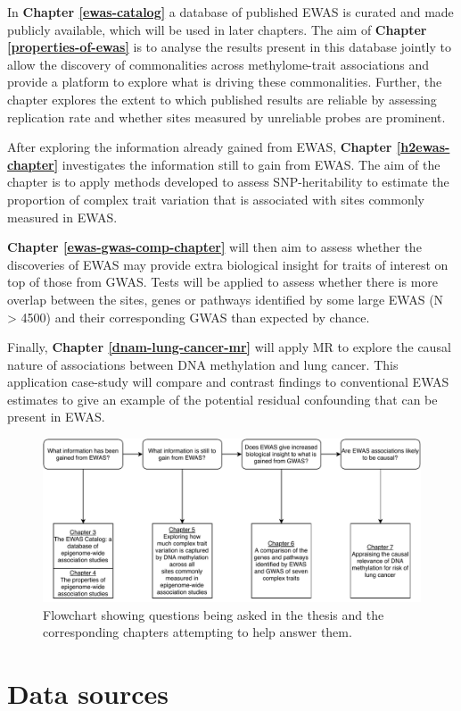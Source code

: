 \documentclass[11pt,oneside]{bristolthesis}
\begin{document}
In \textbf{Chapter \ref{ewas-catalog}} a database of published EWAS is curated and made publicly available, which will be used in later chapters. The aim of \textbf{Chapter \ref{properties-of-ewas}} is to analyse the results present in this database jointly to allow the discovery of commonalities across methylome-trait associations and provide a platform to explore what is driving these commonalities. Further, the chapter explores the extent to which published results are reliable by assessing replication rate and whether sites measured by unreliable probes are prominent.

After exploring the information already gained from EWAS, \textbf{Chapter \ref{h2ewas-chapter}} investigates the information still to gain from EWAS. The aim of the chapter is to apply methods developed to assess SNP-heritability to estimate the proportion of complex trait variation that is associated with sites commonly measured in EWAS.

\textbf{Chapter \ref{ewas-gwas-comp-chapter}} will then aim to assess whether the discoveries of EWAS may provide extra biological insight for traits of interest on top of those from GWAS. Tests will be applied to assess whether there is more overlap between the sites, genes or pathways identified by some large EWAS (N \textgreater{} 4500) and their corresponding GWAS than expected by chance.

Finally, \textbf{Chapter \ref{dnam-lung-cancer-mr}} will apply MR to explore the causal nature of associations between DNA methylation and lung cancer. This application case-study will compare and contrast findings to conventional EWAS estimates to give an example of the potential residual confounding that can be present in EWAS.


\begin{figure}

{\centering \includegraphics[width=1\linewidth]{figure/01-introduction/thesis-flowchart} 

}

\caption{Flowchart showing questions being asked in the thesis and the corresponding chapters attempting to help answer them.}\label{fig:thesis-flowchart}
\end{figure}
\hypertarget{data-sources}{%
\chapter{Data sources}\label{data-sources}}
\end{document}

